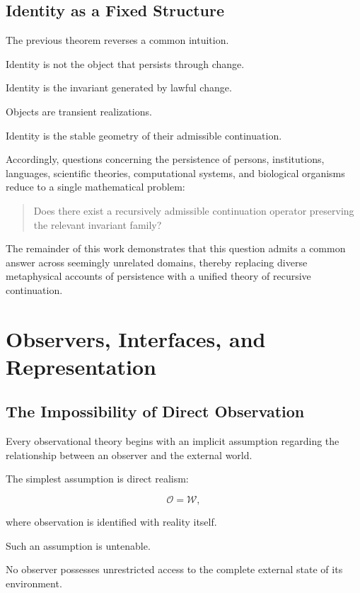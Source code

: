\documentclass[11pt,oneside]{book}
\numberwithin{equation}{chapter}
\theoremstyle{definition}
\theoremstyle{plain}
\begin{document}
\section{Identity as a Fixed Structure}

The previous theorem reverses a common intuition.

Identity is not the object that persists through change.

Identity is the invariant generated by lawful change.

Objects are transient realizations.

Identity is the stable geometry of their admissible continuation.

Accordingly, questions concerning the persistence of persons, institutions,
languages, scientific theories, computational systems, and biological
organisms reduce to a single mathematical problem:

\begin{quote}
Does there exist a recursively admissible continuation operator preserving
the relevant invariant family?
\end{quote}

The remainder of this work demonstrates that this question admits a common
answer across seemingly unrelated domains, thereby replacing diverse
metaphysical accounts of persistence with a unified theory of recursive
continuation.

\chapter{Observers, Interfaces, and Representation}

\section{The Impossibility of Direct Observation}

Every observational theory begins with an implicit assumption regarding the
relationship between an observer and the external world.

The simplest assumption is direct realism:

\[
\mathcal{O}
=
\mathcal{W},
\]

where observation is identified with reality itself.

Such an assumption is untenable.

No observer possesses unrestricted access to the complete external state of
its environment.
\end{document}
